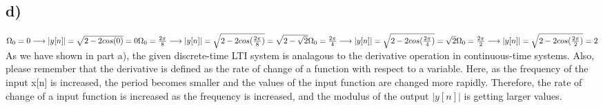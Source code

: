 \documentclass[12pt]{article}
\begin{document}
    \subsection*{d)}
    \begin{math}
      \Omega_0 = 0 \longrightarrow \left\lvert y[n]\right\rvert = \sqrt{2-2cos(0)} = 0 \\
      \Omega_0 = \frac{2\pi}{8} \longrightarrow \left\lvert y[n]\right\rvert = \sqrt{2-2cos(\frac{2\pi}{8})} = \sqrt{2-\sqrt{2}} \\
      \Omega_0 = \frac{2\pi}{4} \longrightarrow \left\lvert y[n]\right\rvert = \sqrt{2-2cos(\frac{2\pi}{4})} = \sqrt{2} \\
      \Omega_0 = \frac{2\pi}{2} \longrightarrow \left\lvert y[n]\right\rvert = \sqrt{2-2cos(\frac{2\pi}{2})} = 2 \\
    \end{math} \\
As we have shown in part a), the given discrete-time LTI system is analagous to the derivative operation in continuous-time systems. Also, please remember that the derivative is defined as the rate of change of a function with respect to a variable. Here, as the frequency of the input x[n] is increased, the period becomes smaller and the values of the input function are changed more rapidly. Therefore, the rate of change of a input function is increased as the frequency is increased, and the modulus of the output \(|y[n]|\) is getting larger values.
\end{document}
